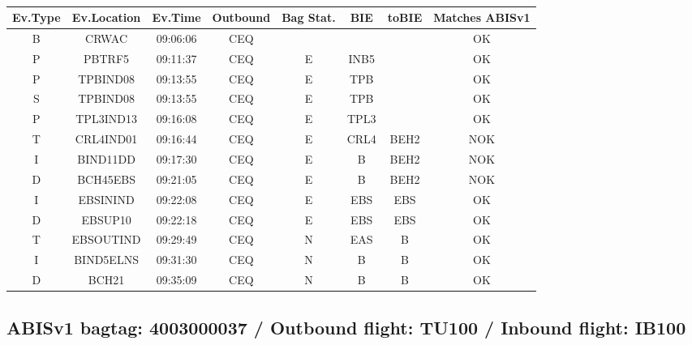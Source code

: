 \documentclass{report}
\begin{document}
\paragraph{}
\begin{longtable}{cccccccc}    \toprule
\rowcolor{white!50}
\textbf{Ev.Type} & \textbf{Ev.Location} & \textbf{Ev.Time} & \textbf{Outbound} & \textbf{Bag Stat.} & \textbf{BIE} & \textbf{toBIE} & \textbf{Matches ABISv1} \\\midrule
B & CRWAC & 09:06:06  & CEQ &  &  &  & OK\\
P & PBTRF5 & 09:11:37  & CEQ & E & INB5 &  & OK\\
P & TPBIND08 & 09:13:55  & CEQ & E & TPB &  & OK\\
S & TPBIND08 & 09:13:55  & CEQ & E & TPB &  & OK\\
P & TPL3IND13 & 09:16:08  & CEQ & E & TPL3 &  & OK\\
T & CRL4IND01 & 09:16:44  & CEQ & E & CRL4 & BEH2 & NOK\\
I & BIND11DD & 09:17:30  & CEQ & E & B & BEH2 & NOK\\
D & BCH45EBS & 09:21:05  & CEQ & E & B & BEH2 & NOK\\
I & EBSININD & 09:22:08  & CEQ & E & EBS & EBS & OK\\
D & EBSUP10 & 09:22:18  & CEQ & E & EBS & EBS & OK\\
T & EBSOUTIND & 09:29:49  & CEQ & N & EAS & B & OK\\
I & BIND5ELNS & 09:31:30  & CEQ & N & B & B & OK\\
D & BCH21 & 09:35:09  & CEQ & N & B & B & OK\\
\bottomrule
\end{longtable}
\subsection*{ABISv1 bagtag: 4003000037 / Outbound flight: TU100 / Inbound flight: IB100}
\end{document}
